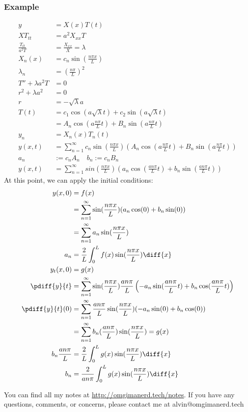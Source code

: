 \documentclass{math}
\begin{document}
\subsubsection*{Example}
\begin{align*}
  y &= X(x)T(t) \\
  XT_{tt} &= a^2X_{xx}T \\
  \frac{T_{tt}}{a^2T} &= \frac{X_{xx}}{X} = \lambda \\
  X_n(x) &= c_n\sin(\frac{n\pi x}{L}) \\
  \lambda_n &= \left(\frac{n\pi}{L}\right)^2 \\
  T''+\lambda a^2T &= 0 \\
  r^2+\lambda a^2 &= 0 \\
  r &= -\sqrt{\lambda}a \\
  T(t) &= c_1\cos(a\sqrt{\lambda}t)+c_2\sin(a\sqrt{\lambda}t) \\
  &= A_n\cos(a\frac{n\pi}{L}t)+B_n\sin(a\frac{n\pi}{L}t) \\
  y_n &= X_n(x)T_n(t) \\
  y(x,t) &= \sum_{n=1}^{\infty}c_n\sin(\frac{n\pi x}{L})
    (A_n\cos(a\frac{n\pi}{L}t)+B_n\sin(a\frac{n\pi}{L}t)) \\
  a_n &:= c_nA_n \quad b_n := c_nB_n \\
  y(x,t) &= \sum_{n=1}^{\infty}
  sin(\frac{n\pi x}{L})(a_n\cos(\frac{an\pi}{L}t)+b_n\sin(\frac{an\pi}{L}t))
\end{align*}
At this point, we can apply the initial conditions:
\begin{align*}
  y(x,0) &= f(x) \\
  &= \sum_{n=1}^{\infty}\sin(\frac{n\pi x}{L})(a_n\cos(0)+b_n\sin(0)) \\
  &= \sum_{n=1}^{\infty}a_n\sin(\frac{n\pi x}{L}) \\
  a_n &= \frac{2}{L}\int_{0}^{L}f(x)\sin(\frac{n\pi x}{L})\diff{x} \\
  y_t(x,0) &= g(x) \\
  \pdiff{y}{t} &= \sum_{n=1}^{\infty}\sin(\frac{n\pi x}{L})\frac{an\pi}{L}
    \left(-a_n\sin(\frac{an\pi}{L}t)+b_n\cos(\frac{an\pi}{L}t)\right) \\
  \pdiff{y}{t}(0) &= \sum_{n=1}^{\infty}\frac{an\pi}{L}\sin(\frac{n\pi x}{L})
    (-a_n\sin(0)+b_n\cos(0)) \\
  &= \sum_{n=1}^{\infty}b_n(\frac{an\pi}{L})\sin(\frac{n\pi x}{L}) = g(x) \\
  b_n\frac{an\pi}{L} &=
    \frac{2}{L}\int_{0}^{L}g(x)\sin(\frac{n\pi x}{L})\diff{x} \\
  b_n &= \frac{2}{an\pi}\int_{0}^{L}g(x)\sin(\frac{n\pi x}{L})\diff{x}
\end{align*}

\begin{center}
  You can find all my notes at \url{http://omgimanerd.tech/notes}. If you have
  any questions, comments, or concerns, please contact me at
  alvin@omgimanerd.tech
\end{center}
\end{document}
